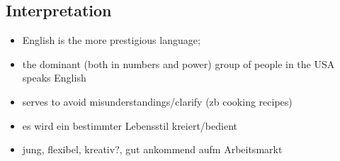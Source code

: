 \subsection{Interpretation}

\begin{itemize}
  \item English is the more prestigious language;
  \item the dominant (both in numbers and power) group of people in the USA speaks English
  \item serves to avoid misunderstandings/clarify (zb cooking recipes)
  \item es wird ein bestimmter Lebensstil kreiert/bedient
  \item jung, flexibel, kreativ?, gut ankommend aufm Arbeitsmarkt
\end{itemize}

